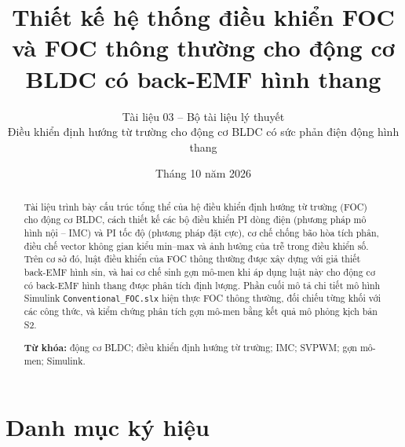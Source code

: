 \documentclass[11pt,a4paper]{article}
\title{\vspace{-1.2cm}\textbf{Thiết kế hệ thống điều khiển FOC và FOC thông thường cho động cơ BLDC có back-EMF hình thang}}
\author{\normalsize Tài liệu 03 -- Bộ tài liệu lý thuyết\\[2pt]
\small Điều khiển định hướng từ trường cho động cơ BLDC có sức phản điện động hình thang}
\date{\small Tháng 10 năm 2026}
\begin{document}
\maketitle

\begin{abstract}
\noindent Tài liệu trình bày cấu trúc tổng thể của hệ điều khiển định hướng từ trường (FOC) cho động cơ BLDC, cách thiết kế các bộ điều khiển PI dòng điện (phương pháp mô hình nội – IMC) và PI tốc độ (phương pháp đặt cực), cơ chế chống bão hòa tích phân, điều chế vector không gian kiểu min–max và ảnh hưởng của trễ trong điều khiển số. Trên cơ sở đó, luật điều khiển của FOC thông thường được xây dựng với giả thiết back-EMF hình sin, và hai cơ chế sinh gợn mô-men khi áp dụng luật này cho động cơ có back-EMF hình thang được phân tích định lượng. Phần cuối mô tả chi tiết mô hình Simulink \texttt{Conventional\_FOC.slx} hiện thực FOC thông thường, đối chiếu từng khối với các công thức, và kiểm chứng phân tích gợn mô-men bằng kết quả mô phỏng kịch bản S2.

\vspace{0.5em}
\noindent\textbf{Từ khóa:} động cơ BLDC; điều khiển định hướng từ trường; IMC; SVPWM; gợn mô-men; Simulink.
\end{abstract}


\tableofcontents
\newpage

\section*{Danh mục ký hiệu}
\end{document}
